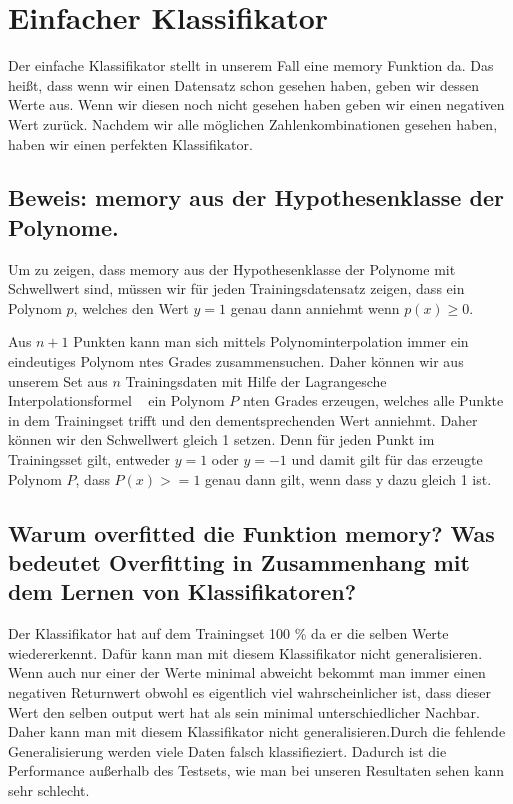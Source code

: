 \section{Einfacher Klassifikator}
\label{ch:implementation}

Der einfache Klassifikator stellt in unserem Fall eine memory Funktion da. Das heißt, dass wenn wir einen Datensatz schon gesehen haben, geben wir dessen Werte aus. Wenn wir diesen noch nicht gesehen haben geben wir einen negativen Wert zurück. Nachdem wir alle möglichen Zahlenkombinationen gesehen haben, haben wir einen perfekten Klassifikator. 

\subsection{Beweis: memory aus der Hypothesenklasse der Polynome.}

Um zu zeigen, dass memory aus der Hypothesenklasse der Polynome mit Schwellwert sind, müssen wir für jeden Trainingsdatensatz zeigen, dass ein Polynom $p$, welches den Wert $y = 1$ genau dann anniehmt wenn $p(x) \ge 0$. 

Aus $n + 1$ Punkten kann man sich mittels Polynominterpolation immer ein eindeutiges Polynom ntes Grades zusammensuchen. Daher können wir aus unserem Set aus $n$ Trainingsdaten mit Hilfe der Lagrangesche Interpolationsformel ~\cite{norlund2013vorlesungen} ein Polynom $P$ nten Grades erzeugen, welches alle Punkte in dem Trainingset trifft und den dementsprechenden Wert anniehmt. Daher können wir den Schwellwert gleich 1 setzen. Denn für jeden Punkt im Trainingsset gilt, entweder $y = 1$ oder $y = -1$ und damit gilt für das erzeugte Polynom $P$, dass $P(x) >= 1$ genau dann gilt, wenn dass y dazu gleich 1 ist.



\subsection{Warum overfitted die Funktion memory? Was bedeutet Overfitting in Zusammenhang mit dem Lernen von Klassifikatoren?} 

Der Klassifikator hat auf dem Trainingset 100 \% da er die selben Werte wiedererkennt. Dafür kann man mit diesem Klassifikator nicht generalisieren. Wenn auch nur einer der Werte minimal abweicht bekommt man immer einen negativen Returnwert obwohl es eigentlich viel wahrscheinlicher ist, dass dieser Wert den selben output wert hat als sein minimal unterschiedlicher Nachbar. Daher kann man mit diesem Klassifikator nicht generalisieren.Durch die fehlende Generalisierung werden viele Daten falsch klassifieziert. Dadurch ist die Performance außerhalb des Testsets, wie man bei unseren Resultaten sehen kann sehr schlecht. 


